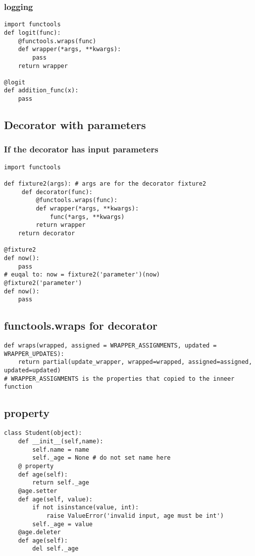 \documentclass[11pt]{article}
\begin{document}
\subsubsection{logging}
\label{sec:org77d2e03}
\begin{verbatim}
import functools
def logit(func):
    @functools.wraps(func)
    def wrapper(*args, **kwargs):
        pass
    return wrapper

@logit
def addition_func(x):
    pass 
\end{verbatim}

\subsection{Decorator with parameters}
\label{sec:orgf9c3db5}
\subsubsection{If the decorator has input parameters}
\label{sec:orgff7b134}

\begin{verbatim}
import functools

def fixture2(args): # args are for the decorator fixture2
     def decorator(func):
         @functools.wraps(func):
         def wrapper(*args, **kwargs):
             func(*args, **kwargs)
         return wrapper
    return decorator

@fixture2
def now():
    pass
# euqal to: now = fixture2('parameter')(now)
@fixture2('parameter')
def now():
    pass 

\end{verbatim}
\subsection{functools.wraps for decorator}
\label{sec:org6f94dfb}
\begin{verbatim}
def wraps(wrapped, assigned = WRAPPER_ASSIGNMENTS, updated = WRAPPER_UPDATES):
    return partial(update_wrapper, wrapped=wrapped, assigned=assigned, updated=updated)
# WRAPPER_ASSIGNMENTS is the properties that copied to the inneer function 
\end{verbatim}
\subsection{property}
\label{sec:org920b85d}
\begin{verbatim}
class Student(object):
    def __init__(self,name):
        self.name = name
        self._age = None # do not set name here
    @ property
    def age(self):
        return self._age
    @age.setter
    def age(self, value):
        if not isinstance(value, int):
            raise ValueError('invalid input, age must be int')
        self._age = value
    @age.deleter
    def age(self):
        del self._age

\end{verbatim}
\end{document}
